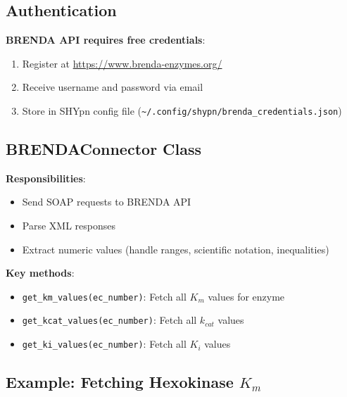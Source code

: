 \subsection{Authentication}
\label{subsec:brenda-authentication}

\textbf{BRENDA API requires free credentials}:

\begin{enumerate}
    \item Register at \url{https://www.brenda-enzymes.org/}
    \item Receive username and password via email
    \item Store in SHYpn config file (\texttt{\textasciitilde/.config/shypn/brenda\_credentials.json})
\end{enumerate}

\subsection{BRENDAConnector Class}
\label{subsec:brenda-connector}

\textbf{Responsibilities}:

\begin{itemize}
    \item Send SOAP requests to BRENDA API
    \item Parse XML responses
    \item Extract numeric values (handle ranges, scientific notation, inequalities)
\end{itemize}

\textbf{Key methods}:

\begin{itemize}
    \item \texttt{get\_km\_values(ec\_number)}: Fetch all $K_m$ values for enzyme
    \item \texttt{get\_kcat\_values(ec\_number)}: Fetch all $k_{cat}$ values
    \item \texttt{get\_ki\_values(ec\_number)}: Fetch all $K_i$ values
\end{itemize}

\subsection{Example: Fetching Hexokinase $K_m$}
\label{subsec:brenda-hexokinase-example}

